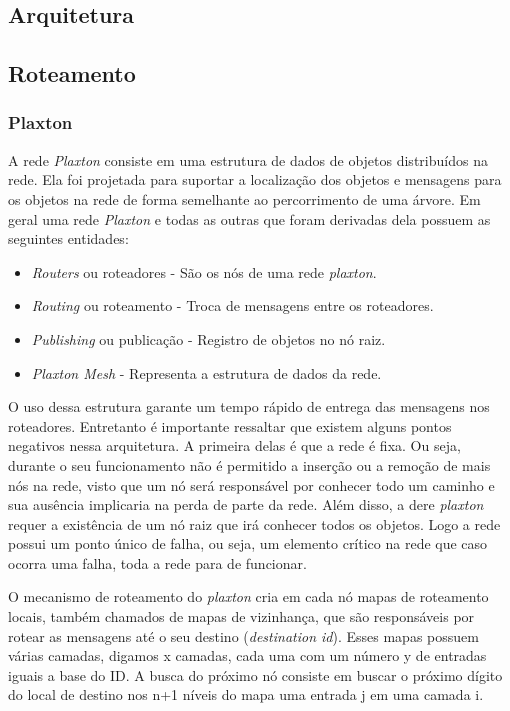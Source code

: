 \subsection{Arquitetura}

\subsection{Roteamento}

\subsubsection{Plaxton}

A rede \emph{Plaxton} consiste em uma estrutura de dados de objetos distribuídos na rede. Ela foi projetada para suportar a localização dos objetos e mensagens para os objetos na rede de forma semelhante ao percorrimento de uma árvore. Em geral uma rede \emph{Plaxton} e todas as outras que foram derivadas dela possuem as seguintes entidades:
\begin{itemize}
	\item \emph{Routers} ou roteadores - São os nós de uma rede \emph{plaxton}.
	\item \emph{Routing} ou roteamento - Troca de mensagens entre os roteadores.
	\item \emph{Publishing} ou publicação - Registro de objetos no nó raiz.
	\item \emph{Plaxton Mesh} - Representa a estrutura de dados da rede.
\end{itemize}

O uso dessa estrutura garante um tempo rápido de entrega das mensagens nos roteadores. Entretanto é importante ressaltar que existem alguns pontos negativos nessa arquitetura. A primeira delas é que a rede é fixa. Ou seja, durante o seu funcionamento não é permitido a inserção ou a remoção de mais nós na rede, visto que um nó será responsável por conhecer todo um caminho e sua ausência implicaria na perda de parte da rede. Além disso, a dere \emph{plaxton} requer a existência de um nó raiz que irá conhecer todos os objetos. Logo a rede possui um ponto único de falha, ou seja, um elemento crítico na rede que caso ocorra uma falha, toda a rede para de funcionar.

O mecanismo de roteamento do \emph{plaxton} cria em cada nó mapas de roteamento locais, também chamados de mapas de vizinhança, que são responsáveis por rotear as mensagens até o seu destino (\emph{destination id}). Esses mapas possuem várias camadas, digamos x camadas, cada uma com um número y de entradas iguais a base do ID. A busca do próximo nó consiste em buscar o próximo dígito do local de destino nos n+1 níveis do mapa uma entrada j em uma camada i.

